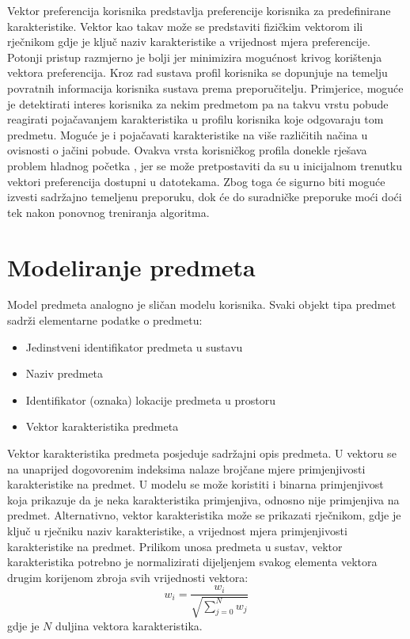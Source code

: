 \documentclass[times, utf8, diplomski, numeric]{fer}
\begin{document}
Vektor preferencija korisnika predstavlja preferencije korisnika za
predefinirane karakteristike. Vektor kao takav može se predstaviti fizičkim
vektorom ili rječnikom gdje je ključ naziv karakteristike a vrijednost mjera
preferencije. Potonji pristup razmjerno je bolji jer minimizira mogućnost krivog
korištenja vektora preferencija.
Kroz rad sustava profil korisnika se dopunjuje na temelju povratnih informacija
korisnika sustava prema preporučitelju. Primjerice, moguće je detektirati
interes korisnika za nekim predmetom pa na takvu vrstu pobude reagirati
pojačavanjem karakteristika u profilu korisnika koje odgovaraju tom predmetu.
Moguće je i pojačavati karakteristike na više različitih načina u ovisnosti o
jačini pobude.
Ovakva vrsta korisničkog profila donekle rješava problem hladnog početka
, jer se može pretpostaviti da su u inicijalnom trenutku
vektori preferencija dostupni u datotekama. Zbog toga će sigurno biti moguće
izvesti sadržajno temeljenu preporuku, dok će do suradničke preporuke moći doći
tek nakon ponovnog treniranja algoritma.

\section{Modeliranje predmeta}

Model predmeta analogno je sličan modelu korisnika. Svaki objekt tipa predmet
sadrži elementarne podatke o predmetu:
\begin{itemize}
  \item Jedinstveni identifikator predmeta u sustavu
  \item Naziv predmeta
  \item Identifikator (oznaka) lokacije predmeta u prostoru
  \item Vektor karakteristika predmeta
\end{itemize}

Vektor karakteristika predmeta posjeduje sadržajni opis predmeta. U vektoru se
na unaprijed dogovorenim indeksima nalaze brojčane mjere primjenjivosti
karakteristike na predmet. U modelu se može koristiti i binarna primjenjivost
koja prikazuje da je neka karakteristika primjenjiva, odnosno nije primjenjiva
na predmet. Alternativno, vektor karakteristika može se prikazati rječnikom,
gdje je ključ u rječniku naziv karakteristike, a vrijednost mjera
primjenjivosti karakteristike na predmet. 
Prilikom unosa predmeta u sustav, vektor karakteristika potrebno je
normalizirati dijeljenjem svakog elementa vektora drugim korijenom zbroja svih
vrijednosti vektora:
\begin{equation}
	\label{eq:norm}
	w_i = \frac
	{
		w_i
	}
	{
		\sqrt{\sum_{j=0}^N w_j}
	}
\end{equation}
gdje je $N$ duljina vektora karakteristika.
\end{document}
